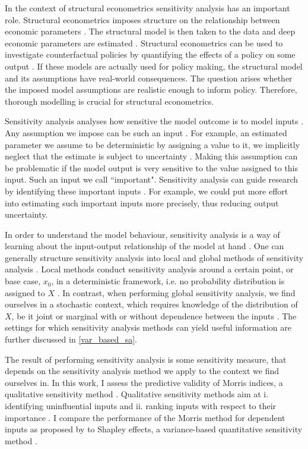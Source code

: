 In the context of structural econometrics sensitivity analysis has an important role. Structural econometrics imposes structure on the relationship between economic parameters \citep{LM17}. The structural model is then taken to the data and deep economic parameters are estimated \citep{LM17}. Structural econometrics can be used to investigate counterfactual policies by quantifying the effects of a policy on some output \citep{LM17}. If these models are actually used for policy making, the structural model and its assumptions have real-world consequences. The question arises whether the imposed model assumptions are realistic enough to inform policy. Therefore, thorough modelling is crucial for structural econometrics.

Sensitivity analysis analyses how sensitive the model outcome is to model inputs \citep{R21}. Any assumption we impose can be such an input \citep{R21}. For example, an estimated parameter we assume to be deterministic by assigning a value to it, we implicitly neglect that the estimate is subject to uncertainty \citep{R21}. Making this assumption can be problematic if the model output is very sensitive to the value assigned to this input. Such an input we call ``important". Sensitivity analysis can guide research by identifying these important inputs \citep{R21}. For example, we could put more effort into estimating such important inputs more precisely, thus reducing output uncertainty.

In order to understand the model behaviour, sensitivity analysis is a way of learning about the input-output relationship of the model at hand \citep{BP16}. One can generally structure sensitivity analysis into local and global methods of sensitivity analysis \citep{BP16}. Local methods conduct sensitivity analysis around a certain point, or base case, $x_0$, in a deterministic framework, i.e. no probability distribution is assigned to $X$ \citep{BP16}. In contrast, when performing global sensitivity analysis, we find ourselves in a stochastic context, which requires knowledge of the distribution of $X$, be it joint or marginal with or without dependence between the inputs \citep{ST02}. The settings for which sensitivity analysis methods can yield useful information are further discussed in \cref{var_based_sa}.

The result of performing sensitivity analysis is some sensitivity measure, that depends on the sensitivity analysis method we apply to the context we find ourselves in. In this work, I assess the predictive validity of Morris indices, a qualitative sensitivity method \citep{M91}. Qualitative sensitivity methods aim at i. identifying uninfluential inputs and ii. ranking inputs with respect to their importance \citep{BP16}. I compare the performance of the Morris method for dependent inputs as proposed by \citet{GM17} to Shapley effects, a variance-based quantitative sensitivity method \citep{O14}.

